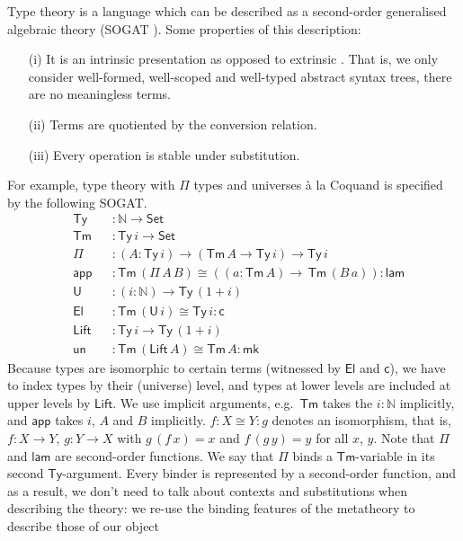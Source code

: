 \documentclass[sigplan,10pt,anonymous,review]{acmart}\settopmatter{printfolios=true,printccs=false,printacmref=false}
\newcommand{\ra}{\rightarrow}
\newcommand{\Set}{\mathsf{Set}}
\newcommand{\Ty}{\mathsf{Ty}}
\newcommand{\Tm}{\mathsf{Tm}}
\newcommand{\N}{\mathbb{N}}
\newcommand{\lam}{\mathsf{lam}}
\newcommand{\app}{\mathsf{app}}
\newcommand{\U}{\mathsf{U}}
\newcommand{\El}{\mathsf{El}}
\newcommand{\cd}{\mathsf{c}}
\newcommand{\Lift}{\mathsf{Lift}}
\newcommand{\mk}{\mathsf{mk}}
\newcommand{\un}{\mathsf{un}}
\begin{document}
Type theory is a language which can be described as a second-order
generalised algebraic theory (SOGAT
\cite{DBLP:conf/fscd/KaposiX24}). Some properties of this description:
\begin{enumerate}
\item[(i)] It is an intrinsic presentation
  \cite{DBLP:conf/csl/AltenkirchR99,DBLP:conf/popl/AltenkirchK16} as
  opposed to extrinsic \cite{abel2013normalization,theo}. That is, we
  only consider well-formed, well-scoped and well-typed abstract
  syntax trees, there are no meaningless terms.
\item[(ii)] Terms are quotiented by the conversion relation.
\item[(iii)] Every operation is stable under substitution.
\end{enumerate}
For example, type theory with $\Pi$ types and universes {\`a} la
Coquand \cite{coquandUniverse} is specified by the following SOGAT.
\begin{equation}\label{eq:tt}
\begin{alignedat}{10}
  & \Ty && : \N\ra\Set \\
  & \Tm && : \Ty\,i\ra\Set \\
  & \Pi && : (A:\Ty\,i)\ra(\Tm\,A\ra\Ty\,i)\ra\Ty\,i \\
  & \app && : \Tm\,(\Pi\,A\,B)\cong((a:\Tm\,A)\ra\,\Tm\,(B\,a)): \lam \\
  & \U && : (i:\N)\ra\Ty\,(1+i) \\
  & \El && : \Tm\,(\U\,i)\cong\Ty\,i : \cd \\
  & \Lift && : \Ty\,i\ra\Ty\,(1+i) \\
  & \un && : \Tm\,(\Lift\,A)\cong\Tm\,A : \mk
\end{alignedat}
\end{equation}
Because types are isomorphic to certain terms (witnessed by $\El$ and $\cd$),
we have to index types by their (universe) level, and types at lower
levels are included at upper levels by $\Lift$. We use implicit
arguments, e.g.\ $\Tm$ takes the $i:\N$ implicitly, and $\app$ takes
$i$, $A$ and $B$ implicitly. $f : X \cong Y : g$ denotes an
isomorphism, that is, $f : X\ra Y$, $g:Y\ra X$ with $g\,(f\,x) = x$
and $f\,(g\,y) = y$ for all $x$, $y$. Note that $\Pi$ and $\lam$ are
second-order functions. We say that $\Pi$ binds a $\Tm$-variable
in its second $\Ty$-argument. Every binder is represented by
a second-order function, and as a result, we don't need to talk about
contexts and substitutions when describing the theory: we re-use the
binding features of the metatheory to describe those of our object
\end{document}
